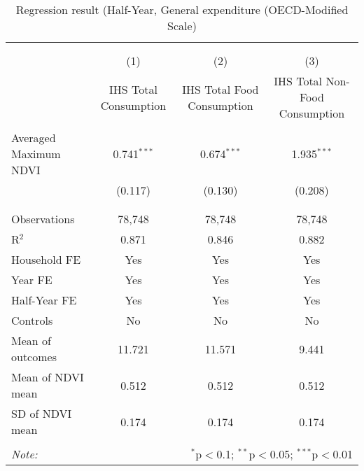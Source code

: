 
\begin{table}[!htbp] \centering 
  \caption{Regression result (Half-Year, General expenditure (OECD-Modified Scale)} 
  \label{emop_cons_per_capita_halfyear_reg.tex} 
\normalsize 
\begin{tabular}{@{\extracolsep{5pt}}lccc} 
\\[-1.8ex]\hline 
\hline \\[-1.8ex] 
\\[-1.8ex] & (1) & (2) & (3)\\ 
 & IHS Total Consumption & IHS Total Food Consumption & IHS Total Non-Food Consumption \\ 
\hline \\[-1.8ex] 
 Averaged Maximum NDVI & 0.741$^{***}$ & 0.674$^{***}$ & 1.935$^{***}$ \\ 
  & (0.117) & (0.130) & (0.208) \\ 
  & & & \\ 
\hline \\[-1.8ex] 
Observations & 78,748 & 78,748 & 78,748 \\ 
R$^{2}$ & 0.871 & 0.846 & 0.882 \\ 
Household FE & Yes & Yes & Yes \\ 
Year FE & Yes & Yes & Yes \\ 
Half-Year FE & Yes & Yes & Yes \\ 
Controls & No & No & No \\ 
Mean of outcomes & 11.721 & 11.571 & 9.441 \\ 
Mean of NDVI mean & 0.512 & 0.512 & 0.512 \\ 
SD of NDVI mean & 0.174 & 0.174 & 0.174 \\ 
\hline \\[-1.8ex] 
\textit{Note:}  & \multicolumn{3}{r}{$^{*}$p$<$0.1; $^{**}$p$<$0.05; $^{***}$p$<$0.01} \\ 
\end{tabular} 
\end{table} 
